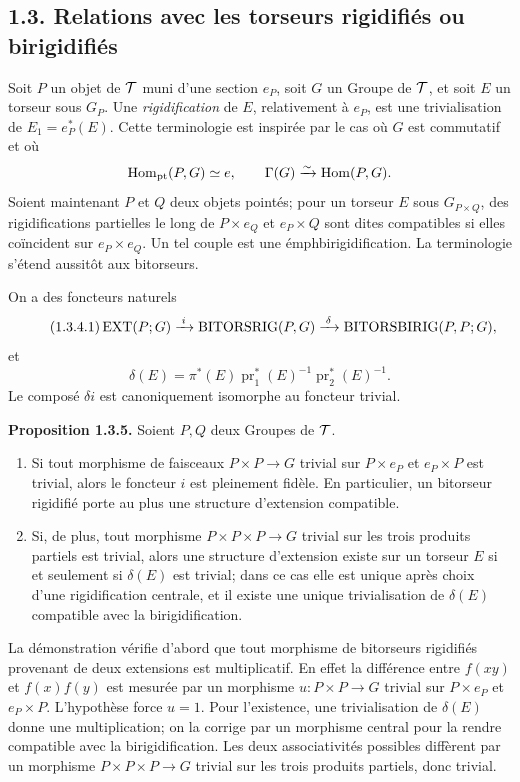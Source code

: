 \documentclass[11pt]{article}
\providecommand{\pr}{\operatorname{pr}}
\begin{document}
\subsection*{1.3. Relations avec les torseurs rigidifiés ou birigidifiés}

Soit \(P\) un objet de \(\mathcal T\) muni d'une section \(e_P\), soit \(G\) un Groupe de \(\mathcal T\), et soit \(E\) un torseur sous \(G_P\).  Une \emph{rigidification} de \(E\), relativement à \(e_P\), est une trivialisation de \(E_1=e_P^*(E)\).  Cette terminologie est inspirée par le cas où \(G\) est commutatif et où
\[
  \operatorname{Hom}_{\mathrm{pt}}(P,G)\simeq e,\qquad
  \Gamma(G)\xrightarrow{\sim}\operatorname{Hom}(P,G).
\]
Soient maintenant \(P\) et \(Q\) deux objets pointés; pour un torseur \(E\) sous \(G_{P\times Q}\), des rigidifications partielles le long de \(P\times e_Q\) et \(e_P\times Q\) sont dites compatibles si elles coïncident sur \(e_P\times e_Q\).  Un tel couple est une émph{birigidification}.  La terminologie s'étend aussitôt aux bitorseurs.

On a des foncteurs naturels
\begin{equation}\tag{1.3.4.1}
  \operatorname{EXT}(P;G)\xrightarrow{\;i\;}\operatorname{BITORSRIG}(P,G)
  \xrightarrow{\;\delta\;}\operatorname{BITORSBIRIG}(P,P;G),
\end{equation}
et
\begin{equation}\tag{1.3.4.2}
  \delta(E)=\pi^*(E)\pr_1^*(E)^{-1}\pr_2^*(E)^{-1}.
\end{equation}
Le composé \(\delta i\) est canoniquement isomorphe au foncteur trivial.

\textbf{Proposition 1.3.5.}  Soient \(P,Q\) deux Groupes de \(\mathcal T\).
\begin{enumerate}[label=\alph*)]
\item Si tout morphisme de faisceaux \(P\times P\to G\) trivial sur \(P\times e_P\) et \(e_P\times P\) est trivial, alors le foncteur \(i\) est pleinement fidèle.  En particulier, un bitorseur rigidifié porte au plus une structure d'extension compatible.
\item Si, de plus, tout morphisme \(P\times P\times P\to G\) trivial sur les trois produits partiels est trivial, alors une structure d'extension existe sur un torseur \(E\) si et seulement si \(\delta(E)\) est trivial; dans ce cas elle est unique après choix d'une rigidification centrale, et il existe une unique trivialisation de \(\delta(E)\) compatible avec la birigidification.
\end{enumerate}

La démonstration vérifie d'abord que tout morphisme de bitorseurs rigidifiés provenant de deux extensions est multiplicatif.  En effet la différence entre \(f(xy)\) et \(f(x)f(y)\) est mesurée par un morphisme \(u:P\times P\to G\) trivial sur \(P\times e_P\) et \(e_P\times P\).  L'hypothèse force \(u=1\).  Pour l'existence, une trivialisation de \(\delta(E)\) donne une multiplication; on la corrige par un morphisme central pour la rendre compatible avec la birigidification.  Les deux associativités possibles diffèrent par un morphisme \(P\times P\times P\to G\) trivial sur les trois produits partiels, donc trivial.
\end{document}

